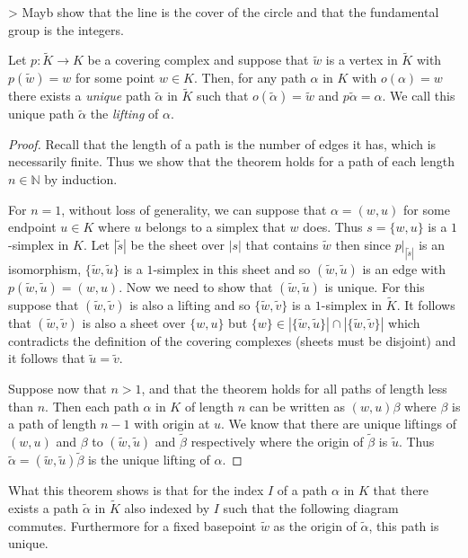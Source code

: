 > Mayb show that the line is the cover of the circle and that the fundamental group is the integers.

\begin{theorem}
  Let $p:\tilde{K} \rightarrow K$ be a covering complex and suppose that $\tilde{w}$ is a vertex in $\tilde{K}$ with $p(\tilde{w}) = w$ for some point $w \in K$. Then, for any path $\alpha$ in $K$ with $o(\alpha) = w$ there exists a \emph{unique} path $\tilde{\alpha}$ in $\tilde{K}$ such that $o(\tilde{\alpha}) = \tilde{w}$ and $p\tilde{\alpha} = \alpha$. We call this unique path $\tilde{\alpha}$ the \emph{lifting} of $\alpha$.
\end{theorem}

\begin{proof}
  Recall that the length of a path is the number of edges it has, which is necessarily finite. Thus we show that the theorem holds for a path of each length $n \in \mathbb{N}$ by induction.

  For $n=1$, without loss of generality, we can suppose that $\alpha = (w,u)$ for some endpoint $u \in K$ where $u$ belongs to a simplex that $w$ does. Thus $s = \{ w,u \}$ is a $1$-simplex in $K$. Let $|\tilde{s}|$ be the sheet over $|s|$ that contains $\tilde{w}$ then since $p \vert_{|\tilde{s}|}$ is an isomorphism, $\{ \tilde{w}, \tilde{u}\}$ is a $1$-simplex in this sheet and so $(\tilde{w},\tilde{u})$ is an edge with $p(\tilde{w},\tilde{u})=(w,u)$. Now we need to show that $(\tilde{w}, \tilde{u})$ is unique. For this suppose that $(\tilde{w}, \tilde{v})$ is also a lifting and so $\{ \tilde{w}, \tilde{v} \}$ is a $1$-simplex in $\tilde{K}$. It follows that $(\tilde{w}, \tilde{v})$ is also a sheet over $\{ w,u \}$ but $\{w\} \in |\{\tilde{w}, \tilde{u}\}| \cap |\{\tilde{w}, \tilde{v}\}|$ which contradicts the definition of the covering complexes (sheets must be disjoint) and it follows that $\tilde{u} = \tilde{v}$.

  Suppose now that $n>1$, and that the theorem holds for all paths of length less than $n$. Then each path $\alpha$ in $K$ of length $n$ can be written as $(w,u)\beta$ where $\beta$ is a path of length $n-1$ with origin at $u$. We know that there are unique liftings of $(w,u)$ and $\beta$ to $(\tilde{w},\tilde{u})$ and $\tilde{\beta}$ respectively where the origin of $\tilde{\beta}$ is $\tilde{u}$. Thus $\tilde{\alpha} = (\tilde{w},\tilde{u})\tilde{\beta}$ is the unique lifting of $\alpha$.
\end{proof}

What this theorem shows is that for the index $I$ of a path $\alpha$ in $K$ that there exists a path $\tilde{\alpha}$ in $\tilde{K}$ also indexed by $I$ such that the following diagram commutes. Furthermore for a fixed basepoint $\tilde{w}$ as the origin of $\tilde{\alpha}$, this path is unique.


